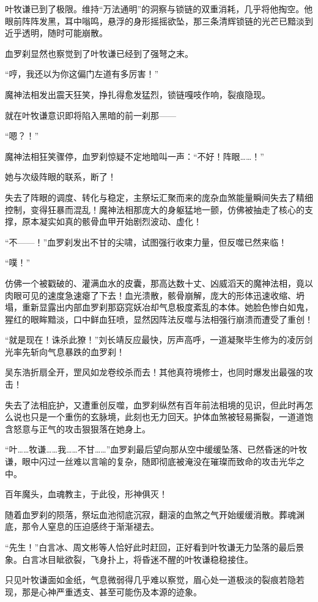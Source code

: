 叶牧谦已到了极限。维持“万法通明”的洞察与锁链的双重消耗，几乎将他掏空。他眼前阵阵发黑，耳中嗡鸣，悬浮的身形摇摇欲坠，那三条清辉锁链的光芒已黯淡到近乎透明，随时可能崩散。

血罗刹显然也察觉到了叶牧谦已经到了强弩之末。

“哼，我还以为你这偏门左道有多厉害！”

魔神法相发出震天狂笑，挣扎得愈发猛烈，锁链嘎吱作响，裂痕隐现。

就在叶牧谦意识即将陷入黑暗的前一刹那——

“嗯？！”

魔神法相狂笑骤停，血罗刹惊疑不定地暗叫一声：“不好！阵眼……！”

她与次级阵眼的联系，断了！

失去了阵眼的调度、转化与稳定，主祭坛汇聚而来的庞杂血煞能量瞬间失去了精细控制，变得狂暴而混乱！魔神法相那庞大的身躯猛地一颤，仿佛被抽走了核心的支撑，原本凝实如真的骸骨血甲开始剧烈波动、虚化！

“不——！”血罗刹发出不甘的尖啸，试图强行收束力量，但反噬已然来临！

“噗！”

仿佛一个被戳破的、灌满血水的皮囊，那高达数十丈、凶威滔天的魔神法相，竟以肉眼可见的速度急速瘪了下去！血光溃散，骸骨崩解，庞大的形体迅速收缩、坍塌，重新显露出内部血罗刹那窈窕妖冶却气息极度紊乱的本体。她脸色惨白如鬼，猩红的眼眸黯淡，口中鲜血狂喷，显然因阵法反噬与法相强行崩溃而遭受了重创！

“就是现在！诛杀此獠！”刘长靖反应最快，厉声高呼，一道凝聚毕生修为的凌厉剑光率先斩向气息暴跌的血罗刹！

吴东浩折扇全开，罡风如龙卷绞杀而去！其他真符境修士，也同时爆发出最强的攻击！

失去了法相庇护，又遭重创反噬，血罗刹纵然有百年前法相境的见识，但此时再怎么说也只是一个重伤的玄脉境，此刻也无力回天。护体血煞被轻易撕裂，一道道饱含怒意与正气的攻击狠狠落在她身上。

“叶……牧谦……我……不甘……”血罗刹最后望向那从空中缓缓坠落、已然昏迷的叶牧谦，眼中闪过一丝难以言喻的复杂，随即彻底被淹没在璀璨而致命的攻击光华之中。

百年魔头，血魂教主，于此役，形神俱灭！

随着血罗刹的陨落，祭坛血池彻底沉寂，翻滚的血煞之气开始缓缓消散。葬魂渊底，那令人窒息的压迫感终于渐渐褪去。

“先生！”白言冰、周文彬等人恰好此时赶回，正好看到叶牧谦无力坠落的最后景象。白言冰目眦欲裂，飞身扑上，将昏迷不醒的叶牧谦稳稳接住。

只见叶牧谦面如金纸，气息微弱得几乎难以察觉，眉心处一道极淡的裂痕若隐若现，那是心神严重透支、甚至可能伤及本源的迹象。

